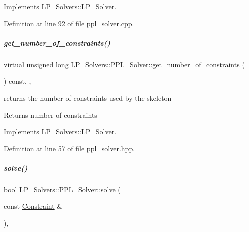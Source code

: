 Implements \hyperlink{group___c_l_s_solvers_a36c14a88e9d3ae9d9321acc7877236d0}{L\+P\+\_\+\+Solvers\+::\+L\+P\+\_\+\+Solver}.



Definition at line 92 of file ppl\+\_\+solver.\+cpp.

\mbox{\label{group___c_l_s_solvers_afb7f014f84eb37026fe26f8c3114c0f0}} 
\subparagraph{\texorpdfstring{get\+\_\+number\+\_\+of\+\_\+constraints()}{get\_number\_of\_constraints()}}
{\footnotesize\ttfamily virtual unsigned long L\+P\+\_\+\+Solvers\+::\+P\+P\+L\+\_\+\+Solver\+::get\+\_\+number\+\_\+of\+\_\+constraints (\begin{DoxyParamCaption}{ }\end{DoxyParamCaption}) const\hspace{0.3cm}{\ttfamily [inline]}, {\ttfamily [override]}, {\ttfamily [virtual]}}



returns the number of constraints used by the skeleton 

\begin{DoxyReturn}{Returns}
number of constraints 
\end{DoxyReturn}


Implements \hyperlink{group___c_l_s_solvers_a1a220bc10c6d8696dd5885d7f3678e5f}{L\+P\+\_\+\+Solvers\+::\+L\+P\+\_\+\+Solver}.



Definition at line 57 of file ppl\+\_\+solver.\+hpp.

\mbox{\label{group___c_l_s_solvers_a9a4a7563d62e4394162aaa4bd08aae29}} 
\subparagraph{\texorpdfstring{solve()}{solve()}\hspace{0.1cm}{\footnotesize\ttfamily [1/2]}}
{\footnotesize\ttfamily bool L\+P\+\_\+\+Solvers\+::\+P\+P\+L\+\_\+\+Solver\+::solve (\begin{DoxyParamCaption}\item[{const \hyperlink{group___c_l_s_solvers_class_l_p___solvers_1_1_constraint}{Constraint} \&}]{ }\end{DoxyParamCaption})\hspace{0.3cm}{\ttfamily [override]}, {\ttfamily [virtual]}}




